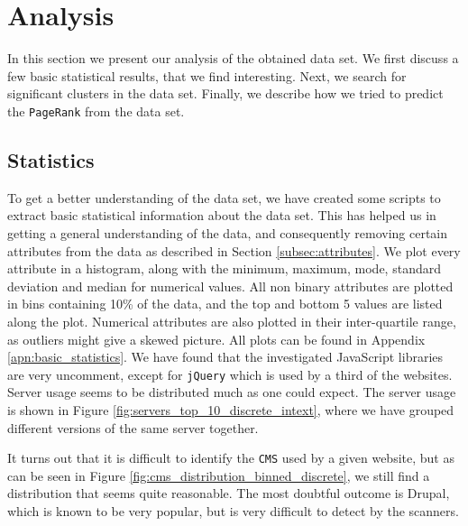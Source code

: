 \section{Analysis}
\label{sec:analysis}

In this section we present our analysis of the obtained data set. We first discuss a few basic statistical results, that we find interesting. Next, we search for significant clusters in the data set. Finally, we describe how we tried to predict the \texttt{PageRank} from the data set.

\subsection{Statistics}
\label{subsec:statistics}

To get a better understanding of the data set, we have created some scripts to extract basic statistical information about the data set. This has helped us in getting a general understanding of the data, and consequently removing certain attributes from the data as described in Section \ref{subsec:attributes}. We plot every attribute in a histogram, along with the minimum, maximum, mode, standard deviation and median for numerical values. All non binary attributes are plotted in bins containing 10\% of the data, and the top and bottom 5 values are listed along the plot. Numerical attributes are also plotted in their inter-quartile range, as outliers might give a skewed picture. All plots can be found in Appendix \ref{apn:basic_statistics}. We have found that the investigated JavaScript libraries are very uncomment, except for \texttt{jQuery} which is used by a third of the websites. Server usage seems to be distributed much as one could expect. The server usage is shown in Figure \ref{fig:servers_top_10_discrete_intext}, where we have grouped different versions of the same server together.


It turns out that it is difficult to identify the \texttt{CMS} used by a given website, but as can be seen in Figure \ref{fig:cms_distribution_binned_discrete}, we still find a distribution that seems quite reasonable. The most doubtful outcome is Drupal, which is known to be very popular, but is very difficult to detect by the scanners.


